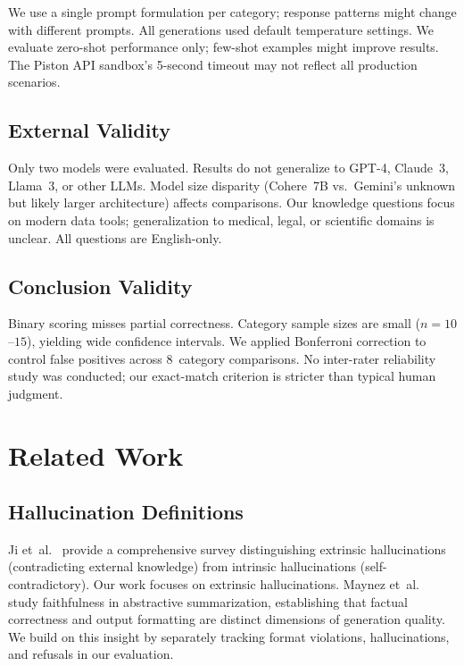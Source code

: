 \documentclass[conference]{IEEEtran}
\begin{document}
We use a single prompt formulation per category; response patterns might change with different prompts. All generations used default temperature settings. We evaluate zero-shot performance only; few-shot examples might improve results. The Piston API sandbox's 5-second timeout may not reflect all production scenarios.

\subsection{External Validity}

Only two models were evaluated. Results do not generalize to GPT-4, Claude~3, Llama~3, or other LLMs. Model size disparity (Cohere~7B vs.\ Gemini's unknown but likely larger architecture) affects comparisons. Our knowledge questions focus on modern data tools; generalization to medical, legal, or scientific domains is unclear. All questions are English-only.

\subsection{Conclusion Validity}

Binary scoring misses partial correctness. Category sample sizes are small ($n=10$--$15$), yielding wide confidence intervals. We applied Bonferroni correction to control false positives across 8~category comparisons. No inter-rater reliability study was conducted; our exact-match criterion is stricter than typical human judgment.

\section{Related Work}

\subsection{Hallucination Definitions}

Ji et~al.~\cite{ji2023survey} provide a comprehensive survey distinguishing extrinsic hallucinations (contradicting external knowledge) from intrinsic hallucinations (self-contradictory). Our work focuses on extrinsic hallucinations. Maynez et~al.~\cite{maynez2020faithfulness} study faithfulness in abstractive summarization, establishing that factual correctness and output formatting are distinct dimensions of generation quality. We build on this insight by separately tracking format violations, hallucinations, and refusals in our evaluation.
\end{document}
